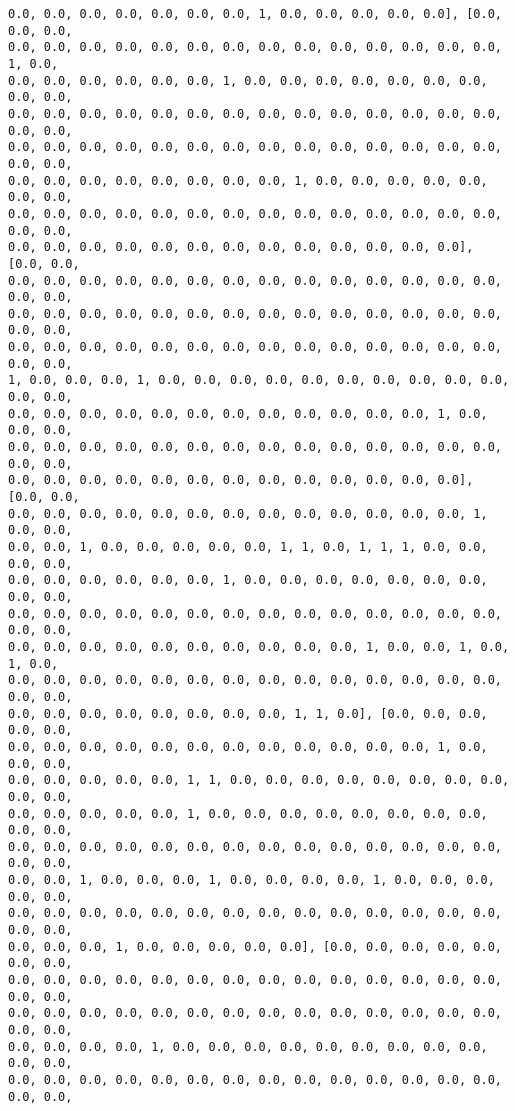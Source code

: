 \documentclass[11pt]{article}
\begin{document}
\begin{Verbatim}[commandchars=\\\{\}]
0.0, 0.0, 0.0, 0.0, 0.0, 0.0, 0.0, 1, 0.0, 0.0, 0.0, 0.0, 0.0], [0.0, 0.0, 0.0,
0.0, 0.0, 0.0, 0.0, 0.0, 0.0, 0.0, 0.0, 0.0, 0.0, 0.0, 0.0, 0.0, 0.0, 1, 0.0,
0.0, 0.0, 0.0, 0.0, 0.0, 0.0, 1, 0.0, 0.0, 0.0, 0.0, 0.0, 0.0, 0.0, 0.0, 0.0,
0.0, 0.0, 0.0, 0.0, 0.0, 0.0, 0.0, 0.0, 0.0, 0.0, 0.0, 0.0, 0.0, 0.0, 0.0, 0.0,
0.0, 0.0, 0.0, 0.0, 0.0, 0.0, 0.0, 0.0, 0.0, 0.0, 0.0, 0.0, 0.0, 0.0, 0.0, 0.0,
0.0, 0.0, 0.0, 0.0, 0.0, 0.0, 0.0, 0.0, 1, 0.0, 0.0, 0.0, 0.0, 0.0, 0.0, 0.0,
0.0, 0.0, 0.0, 0.0, 0.0, 0.0, 0.0, 0.0, 0.0, 0.0, 0.0, 0.0, 0.0, 0.0, 0.0, 0.0,
0.0, 0.0, 0.0, 0.0, 0.0, 0.0, 0.0, 0.0, 0.0, 0.0, 0.0, 0.0, 0.0], [0.0, 0.0,
0.0, 0.0, 0.0, 0.0, 0.0, 0.0, 0.0, 0.0, 0.0, 0.0, 0.0, 0.0, 0.0, 0.0, 0.0, 0.0,
0.0, 0.0, 0.0, 0.0, 0.0, 0.0, 0.0, 0.0, 0.0, 0.0, 0.0, 0.0, 0.0, 0.0, 0.0, 0.0,
0.0, 0.0, 0.0, 0.0, 0.0, 0.0, 0.0, 0.0, 0.0, 0.0, 0.0, 0.0, 0.0, 0.0, 0.0, 0.0,
1, 0.0, 0.0, 0.0, 1, 0.0, 0.0, 0.0, 0.0, 0.0, 0.0, 0.0, 0.0, 0.0, 0.0, 0.0, 0.0,
0.0, 0.0, 0.0, 0.0, 0.0, 0.0, 0.0, 0.0, 0.0, 0.0, 0.0, 0.0, 1, 0.0, 0.0, 0.0,
0.0, 0.0, 0.0, 0.0, 0.0, 0.0, 0.0, 0.0, 0.0, 0.0, 0.0, 0.0, 0.0, 0.0, 0.0, 0.0,
0.0, 0.0, 0.0, 0.0, 0.0, 0.0, 0.0, 0.0, 0.0, 0.0, 0.0, 0.0, 0.0], [0.0, 0.0,
0.0, 0.0, 0.0, 0.0, 0.0, 0.0, 0.0, 0.0, 0.0, 0.0, 0.0, 0.0, 0.0, 1, 0.0, 0.0,
0.0, 0.0, 1, 0.0, 0.0, 0.0, 0.0, 0.0, 1, 1, 0.0, 1, 1, 1, 0.0, 0.0, 0.0, 0.0,
0.0, 0.0, 0.0, 0.0, 0.0, 0.0, 1, 0.0, 0.0, 0.0, 0.0, 0.0, 0.0, 0.0, 0.0, 0.0,
0.0, 0.0, 0.0, 0.0, 0.0, 0.0, 0.0, 0.0, 0.0, 0.0, 0.0, 0.0, 0.0, 0.0, 0.0, 0.0,
0.0, 0.0, 0.0, 0.0, 0.0, 0.0, 0.0, 0.0, 0.0, 0.0, 1, 0.0, 0.0, 1, 0.0, 1, 0.0,
0.0, 0.0, 0.0, 0.0, 0.0, 0.0, 0.0, 0.0, 0.0, 0.0, 0.0, 0.0, 0.0, 0.0, 0.0, 0.0,
0.0, 0.0, 0.0, 0.0, 0.0, 0.0, 0.0, 0.0, 1, 1, 0.0], [0.0, 0.0, 0.0, 0.0, 0.0,
0.0, 0.0, 0.0, 0.0, 0.0, 0.0, 0.0, 0.0, 0.0, 0.0, 0.0, 0.0, 1, 0.0, 0.0, 0.0,
0.0, 0.0, 0.0, 0.0, 0.0, 1, 1, 0.0, 0.0, 0.0, 0.0, 0.0, 0.0, 0.0, 0.0, 0.0, 0.0,
0.0, 0.0, 0.0, 0.0, 0.0, 1, 0.0, 0.0, 0.0, 0.0, 0.0, 0.0, 0.0, 0.0, 0.0, 0.0,
0.0, 0.0, 0.0, 0.0, 0.0, 0.0, 0.0, 0.0, 0.0, 0.0, 0.0, 0.0, 0.0, 0.0, 0.0, 0.0,
0.0, 0.0, 1, 0.0, 0.0, 0.0, 1, 0.0, 0.0, 0.0, 0.0, 1, 0.0, 0.0, 0.0, 0.0, 0.0,
0.0, 0.0, 0.0, 0.0, 0.0, 0.0, 0.0, 0.0, 0.0, 0.0, 0.0, 0.0, 0.0, 0.0, 0.0, 0.0,
0.0, 0.0, 0.0, 1, 0.0, 0.0, 0.0, 0.0, 0.0], [0.0, 0.0, 0.0, 0.0, 0.0, 0.0, 0.0,
0.0, 0.0, 0.0, 0.0, 0.0, 0.0, 0.0, 0.0, 0.0, 0.0, 0.0, 0.0, 0.0, 0.0, 0.0, 0.0,
0.0, 0.0, 0.0, 0.0, 0.0, 0.0, 0.0, 0.0, 0.0, 0.0, 0.0, 0.0, 0.0, 0.0, 0.0, 0.0,
0.0, 0.0, 0.0, 0.0, 1, 0.0, 0.0, 0.0, 0.0, 0.0, 0.0, 0.0, 0.0, 0.0, 0.0, 0.0,
0.0, 0.0, 0.0, 0.0, 0.0, 0.0, 0.0, 0.0, 0.0, 0.0, 0.0, 0.0, 0.0, 0.0, 0.0, 0.0,

\end{Verbatim}
\end{document}

